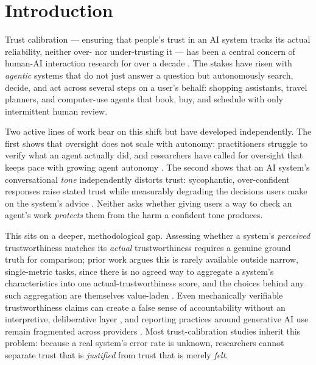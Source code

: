 \documentclass[manuscript]{acmart}
\begin{document}

\maketitle

\section{Introduction}

Trust calibration --- ensuring that people's trust in an AI system tracks its actual reliability, neither over- nor under-trusting it --- has been a central concern of human-AI interaction research for over a decade \cite{leesee2004trust, mehrotra2021modelling}. The stakes have risen with \emph{agentic} systems that do not just answer a question but autonomously search, decide, and act across several steps on a user's behalf: shopping assistants, travel planners, and computer-use agents that book, buy, and schedule with only intermittent human review.

Two active lines of work bear on this shift but have developed independently. The first shows that oversight does not scale with autonomy: practitioners struggle to verify what an agent actually did, and researchers have called for oversight that keeps pace with growing agent autonomy \cite{dhanorkar2026oversight, jain2026complementarity}. The second shows that an AI system's conversational \emph{tone} independently distorts trust: sycophantic, over-confident responses raise stated trust while measurably degrading the decisions users make on the system's advice \cite{sun2026friendly, liu2026flattery, li2026sycophancy, cheng2025sycophantic}. Neither asks whether giving users a way to check an agent's work \emph{protects} them from the harm a confident tone produces.

This sits on a deeper, methodological gap. Assessing whether a system's \emph{perceived} trustworthiness matches its \emph{actual} trustworthiness requires a genuine ground truth for comparison; prior work argues this is rarely available outside narrow, single-metric tasks, since there is no agreed way to aggregate a system's characteristics into one actual-trustworthiness score, and the choices behind any such aggregation are themselves value-laden \cite{delibtrust2026, barocas2021disaggregated}. Even mechanically verifiable trustworthiness claims can create a false sense of accountability without an interpretive, deliberative layer \cite{paris2026donttrust}, and reporting practices around generative AI use remain fragmented across providers \cite{balayn2026reporting}. Most trust-calibration studies inherit this problem: because a real system's error rate is unknown, researchers cannot separate trust that is \emph{justified} from trust that is merely \emph{felt}.
\end{document}
